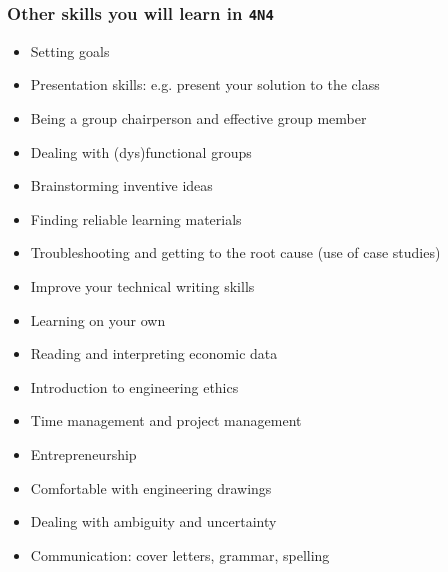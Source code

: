 \begin{frame}\frametitle{Other skills you will learn in \texttt{4N4}}
	\begin{itemize}
		\item	Setting goals
		\item	Presentation skills: e.g. present your solution to the class
		\item	Being a group chairperson and effective group member
		\item	Dealing with (dys)functional groups
		\item	Brainstorming inventive ideas
		\item	Finding reliable learning materials
		\item	Troubleshooting and getting to the root cause {\scriptsize (use of case studies)}
		\item	Improve your technical writing skills
		\item	Learning on your own
		\item	Reading and interpreting economic data
		\item	Introduction to engineering ethics
		\item	Time management and project management
		\item	Entrepreneurship
		\item	Comfortable with engineering drawings
		\item	Dealing with ambiguity and uncertainty
		\item	Communication: cover letters, grammar, spelling
	\end{itemize}
\end{frame}

